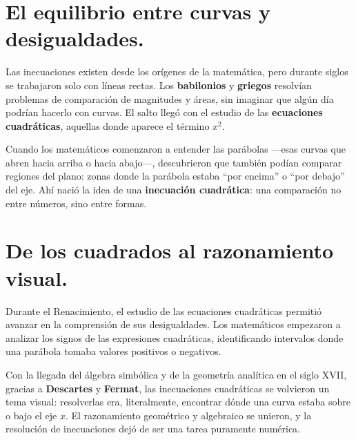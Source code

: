 
\vspace{0.5cm}

\vspace{1em}
\section*{El equilibrio entre curvas y desigualdades.}

\begin{reseñaplana}
Las inecuaciones existen desde los orígenes de la matemática, pero durante siglos se trabajaron solo con líneas rectas.  
Los \textbf{babilonios} y \textbf{griegos} resolvían problemas de comparación de magnitudes y áreas, 
sin imaginar que algún día podrían hacerlo con curvas.  
El salto llegó con el estudio de las \textbf{ecuaciones cuadráticas}, aquellas donde aparece el término $x^2$.  

Cuando los matemáticos comenzaron a entender las parábolas —esas curvas que abren hacia arriba o hacia abajo—, 
descubrieron que también podían comparar regiones del plano: zonas donde la parábola estaba “por encima” o “por debajo” del eje.  
Ahí nació la idea de una \textbf{inecuación cuadrática}: una comparación no entre números, sino entre formas.  
\end{reseñaplana}

\section*{De los cuadrados al razonamiento visual.}
\begin{reseñaplana}
Durante el Renacimiento, el estudio de las ecuaciones cuadráticas permitió avanzar en la comprensión de sus desigualdades.  
Los matemáticos empezaron a analizar los signos de las expresiones cuadráticas, identificando intervalos donde una parábola 
tomaba valores positivos o negativos.  

Con la llegada del álgebra simbólica y de la geometría analítica en el siglo XVII, gracias a \textbf{Descartes} y \textbf{Fermat}, 
las inecuaciones cuadráticas se volvieron un tema visual: resolverlas era, literalmente, encontrar dónde una curva 
estaba sobre o bajo el eje $x$.  
El razonamiento geométrico y algebraico se unieron, y la resolución de inecuaciones dejó de ser una tarea puramente numérica.  
\end{reseñaplana}


